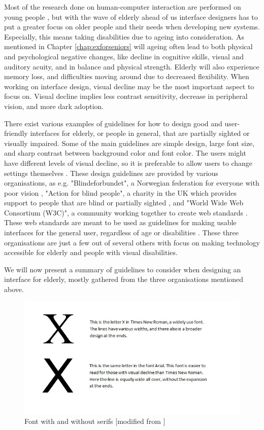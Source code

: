 Most of the research done on human-computer interaction are performed on young people \cite{dickinson2007methods}, but with the wave of elderly ahead of us interface designers has to put a greater focus on older people and their needs when developing new systems. Especially, this means taking disabilities due to ageing into consideration. As mentioned in Chapter \ref{chap:exforseniors} will ageing often lead to both physical and psychological negative changes, like decline in cognitive skills, visual and auditory acuity, and in balance and physical strength. Elderly will also experience memory loss, and difficulties moving around due to decreased flexibility. When working on interface design, visual decline may be the most important aspect to focus on. Visual decline implies less contrast sensitivity, decrease in peripheral vision, and more dark adoption. 

There exist various examples of guidelines for how to design good and user-friendly interfaces for elderly, or people in general, that are partially sighted or visually impaired. Some of the main guidelines are simple design, large font size, and sharp contrast between background color and font color. The users might have different levels of visual decline, so it is preferable to allow users to change settings themselves \cite{blindeforbundetTekst} \cite{actionforblindpeopleTekst} \cite{w3cTekst}. These design guidelines are provided by various organisations, as e.g. "Blindeforbundet", a Norwegian federation for everyone with poor vision \cite{blindeforbundet}, "Action for blind people", a charity in the UK which provides support to people that are blind or partially sighted \cite{actionforblindpeople}, and "World Wide Web Consortium (W3C)", a community working together to create web standards \cite{w3c}. These web standards are meant to be used as guidelines for making usable interfaces for the general user, regardless of age or disabilities \cite{w3cTekst}. These three organisations are just a few out of several others with focus on making technology accessible for elderly and people with visual disabilities. 

We will now present a summary of guidelines to consider when designing an interface for elderly, mostly gathered from the three organisations mentioned above.

\begin{figure} [ht!]
\centering
\includegraphics[scale=0.9]{fontExample.jpg}
\caption[Fonts]{Font with and without serifs [modified from \cite{blindeforbundetTekst}]}
\label{fig:fonts}
\end{figure}

